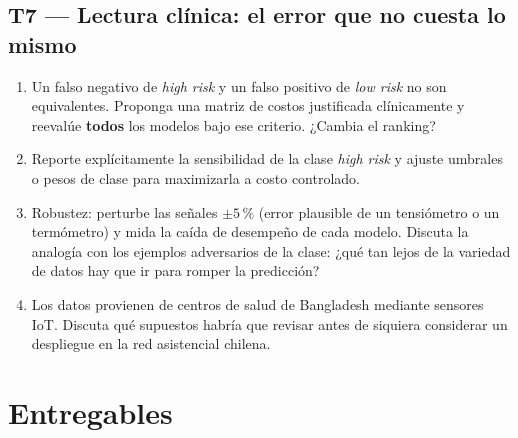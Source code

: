 \documentclass[11pt, a4paper]{article}
\newcommand{\enlace}[1]{\par\vspace{2pt}{\footnotesize\color{StanfordGray}%
	$\hookrightarrow$\  #1}}
\begin{document}
\subsection*{T7 --- Lectura clínica: el error que no cuesta lo mismo}
\begin{enumerate}
	\item Un falso negativo de \emph{high risk} y un falso positivo de \emph{low risk} no son equivalentes. Proponga una matriz de costos justificada cl\'inicamente y reeval\'ue \textbf{todos} los modelos bajo ese criterio. ¿Cambia el ranking?
	\item Reporte expl\'icitamente la sensibilidad de la clase \emph{high risk} y ajuste umbrales o pesos de clase para maximizarla a costo controlado.
	\item Robustez: perturbe las se\~nales $\pm 5\,\%$ (error plausible de un tensi\'ometro o un term\'ometro) y mida la ca\'ida de desempe\~no de cada modelo. Discuta la analog\'ia con los ejemplos adversarios de la clase: ¿qu\'e tan lejos de la variedad de datos hay que ir para romper la predicci\'on?
	\item Los datos provienen de centros de salud de Bangladesh mediante sensores IoT. Discuta qu\'e supuestos habr\'ia que revisar antes de siquiera considerar un despliegue en la red asistencial chilena.
\end{enumerate}

\section{Entregables}
\end{document}
